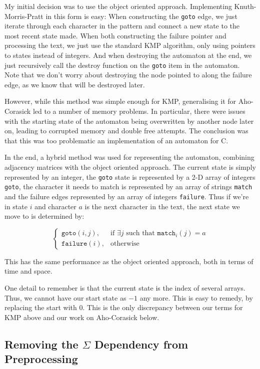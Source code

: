 \documentclass[ %
                    author={Dominic Joseph Moylett},
                    degree={MEng},
                     title={Dictionary Matching with Fingerprints},
                  subtitle={An Empirical Analysis},
                      type={research},
                      year={2015} ]{dissertation}
\begin{document}
My initial decision was to use the object oriented approach. Implementing Knuth-Morris-Pratt in this form is easy: When constructing the \texttt{goto} edge, we just iterate through each character in the pattern and connect a new state to the most recent state made. When both constructing the failure pointer and processing the text, we just use the standard KMP algorithm, only using pointers to states instead of integers. And when destroying the automaton at the end, we just recursively call the destroy function on the \texttt{goto} item in the automaton. Note that we don't worry about destroying the node pointed to along the failure edge, as we know that will be destroyed later.

However, while this method was simple enough for KMP, generalising it for Aho-Corasick led to a number of memory problems. In particular, there were issues with the starting state of the automaton being overwritten by another node later on, leading to corrupted memory and double free attempts. The conclusion was that this was too problematic an implementation of an automaton for C.

In the end, a hybrid method was used for representing the automaton, combining adjacency matrices with the object oriented approach. The current state is simply represented by an integer, the \texttt{goto} state is represented by a 2-D array of integers \texttt{goto}, the character it needs to match is represented by an array of strings \texttt{match} and the failure edges represented by an array of integers \texttt{failure}. Thus if we're in state $i$ and character $a$ is the next character in the text, the next state we move to is determined by:

\[
  \begin{cases}
    \texttt{goto}(i, j),& \text{if } \exists j \text{ such that } \texttt{match}_i(j) = a\\
    \texttt{failure}(i),& \text{otherwise}
  \end{cases}
\]

This has the same performance as the object oriented approach, both in terms of time and space.

One detail to remember is that the current state is the index of several arrays. Thus, we cannot have our start state as $-1$ any more. This is easy to remedy, by replacing the start with 0. This is the only discrepancy between our terms for KMP above and our work on Aho-Corasick below.

\subsection{Removing the $\Sigma$ Dependency from Preprocessing}
\label{ssec:ac-hashing}
\end{document}
